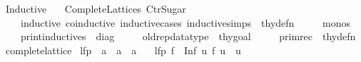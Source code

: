 %
\begin{isabellebody}%
%
%
\isadelimdocument
%
\endisadelimdocument
%
\isatagdocument
%
\isamarkuptrue%
%
\endisatagdocument
{\isafolddocument}%
%
\isadelimdocument
%
\endisadelimdocument
%
\isadelimtheory
%
\endisadelimtheory
%
\isatagtheory
{}\isamarkupfalse%
\ Inductive\isanewline
\ \ \ Complete{\isacharunderscore}{\kern0pt}Lattices\ Ctr{\isacharunderscore}{\kern0pt}Sugar\isanewline
\ \ \isanewline
\ \ \ \ {\isachardoublequoteopen}inductive{\isachardoublequoteclose}\ {\isachardoublequoteopen}coinductive{\isachardoublequoteclose}\ {\isachardoublequoteopen}inductive{\isacharunderscore}{\kern0pt}cases{\isachardoublequoteclose}\ {\isachardoublequoteopen}inductive{\isacharunderscore}{\kern0pt}simps{\isachardoublequoteclose}\ {\isacharcolon}{\kern0pt}{\isacharcolon}{\kern0pt}\ thy{\isacharunderscore}{\kern0pt}defn\ \isanewline
\ \ \ \ {\isachardoublequoteopen}monos{\isachardoublequoteclose}\ \isanewline
\ \ \ \ {\isachardoublequoteopen}print{\isacharunderscore}{\kern0pt}inductives{\isachardoublequoteclose}\ {\isacharcolon}{\kern0pt}{\isacharcolon}{\kern0pt}\ diag\ \isanewline
\ \ \ \ {\isachardoublequoteopen}old{\isacharunderscore}{\kern0pt}rep{\isacharunderscore}{\kern0pt}datatype{\isachardoublequoteclose}\ {\isacharcolon}{\kern0pt}{\isacharcolon}{\kern0pt}\ thy{\isacharunderscore}{\kern0pt}goal\ \isanewline
\ \ \ \ {\isachardoublequoteopen}primrec{\isachardoublequoteclose}\ {\isacharcolon}{\kern0pt}{\isacharcolon}{\kern0pt}\ thy{\isacharunderscore}{\kern0pt}defn\isanewline
{}%
\endisatagtheory
{\isafoldtheory}%
%
\isadelimtheory
%
\endisadelimtheory
%
\isadelimdocument
%
\endisadelimdocument
%
\isatagdocument
%
\isamarkuptrue%
%
\endisatagdocument
{\isafolddocument}%
%
\isadelimdocument
%
\endisadelimdocument
{}\isamarkupfalse%
\ complete{\isacharunderscore}{\kern0pt}lattice\isanewline
{}\isanewline
\isanewline
{}\isamarkupfalse%
\ lfp\ {\isacharcolon}{\kern0pt}{\isacharcolon}{\kern0pt}\ {\isachardoublequoteopen}{\isacharparenleft}{\kern0pt}{\isacharprime}{\kern0pt}a\ {\isasymRightarrow}\ {\isacharprime}{\kern0pt}a{\isacharparenright}{\kern0pt}\ {\isasymRightarrow}\ {\isacharprime}{\kern0pt}a{\isachardoublequoteclose}\isanewline
\ \ \ {\isachardoublequoteopen}lfp\ f\ {\isacharequal}{\kern0pt}\ Inf\ {\isacharbraceleft}{\kern0pt}u{\isachardot}{\kern0pt}\ f\ u\ {\isasymle}\ u{\isacharbraceright}{\kern0pt}{\isachardoublequoteclose}\isanewline

\end{isabellebody}
